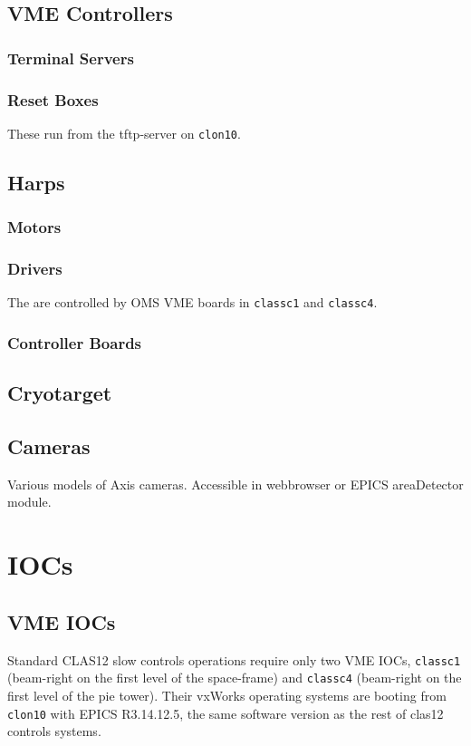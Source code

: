 \documentclass[amsmath,amssymb,notitlepage,11pt]{revtex4}
\begin{document}
\subsection{VME Controllers}
\subsubsection{Terminal Servers}
\subsubsection{Reset Boxes}
These run from the tftp-server on \texttt{clon10}.

\subsection{Harps}
\subsubsection{Motors}
\subsubsection{Drivers}
The are controlled by OMS VME boards in \texttt{classc1} and \texttt{classc4}.
\subsubsection{Controller Boards}

\subsection{Cryotarget}

\subsection{Cameras}
Various models of Axis cameras.  Accessible in webbrowser or EPICS areaDetector module.

\section{IOCs}

\subsection{VME IOCs}
Standard CLAS12 slow controls operations require only two VME IOCs, \texttt{classc1} (beam-right on the first level of the space-frame) and \texttt{classc4} (beam-right on the first level of the pie tower).  Their vxWorks operating systems are booting from \texttt{clon10} with EPICS R3.14.12.5, the same software version as the rest of clas12 controls systems.
\end{document}
